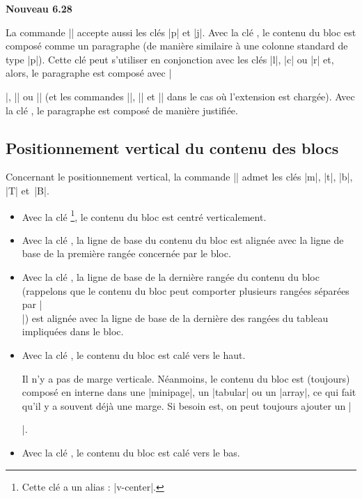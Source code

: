 \documentclass[dvipsnames]{article}%
\begin{document}
\bigskip
\colorbox{yellow!50}{\bfseries Nouveau 6.28}\par\nobreak

\smallskip
La commande |\Block| accepte aussi les clés |p| et |j|. Avec la clé
, le contenu du bloc est composé comme un paragraphe (de manière
similaire à une colonne standard de type |p|). Cette clé peut s'utiliser en
conjonction avec les clés |l|, |c| ou |r| et, alors, le paragraphe est composé
avec |\raggedright|, |\centering| ou |\raggedleft| (et les commandes
|\RaggedRight|, |\Centering| et |\RaggedLeft| dans le cas où l'extension
 est chargée). Avec la clé ,
le paragraphe est composé de manière justifiée.


\subsection{Positionnement vertical du contenu des blocs}


\label{vertical-pos-block}

Concernant le positionnement vertical, la commande |\Block| admet les clés
|m|, |t|, |b|, |T| et~|B|.


\begin{itemize}
\item {}
Avec la clé \footnote{Cette clé a un alias : |v-center|.}, le
contenu du bloc est centré verticalement. 

\item Avec la clé , la ligne de base du contenu du bloc est alignée avec la
ligne de base de la première rangée concernée par le bloc.

\item Avec la clé , la ligne de base de la dernière rangée du contenu du bloc
(rappelons que le contenu du bloc peut comporter plusieurs rangées séparées par
|\\|) est alignée avec la ligne de base de la dernière des rangées du tableau
impliquées dans le bloc.

\item Avec la clé , le contenu du bloc est calé vers le haut.

Il n'y a pas de marge verticale. Néanmoins, le contenu du bloc est (toujours)
composé en interne dans une |{minipage}|, un |{tabular}| ou un |{array}|, ce qui
fait qu'il y a souvent déjà une marge. Si besoin est, on peut toujours ajouter
un |\strut|.

\item Avec la clé , le contenu du bloc est calé vers le bas.
\end{itemize}
\end{document}
